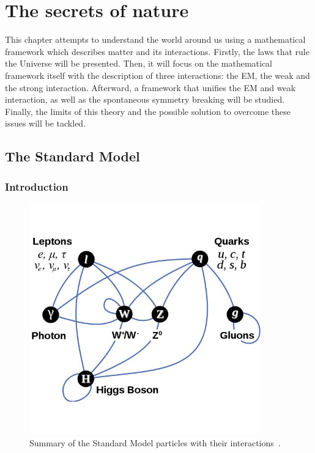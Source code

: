 \chapter{The secrets of nature}
\label{chap:SM}

  This chapter attempts to understand the world around us using a mathematical framework which describes matter and its interactions.
  Firstly, the laws that rule the Universe will be presented.
  Then, it will focus on the mathematical framework itself with the description of three interactions: the \gls{EM}, the weak and the strong interaction.
  Afterward, a framework that unifies the \gls{EM} and weak interaction, as well as the spontaneous symmetry breaking will be studied.
  Finally, the limits of this theory and the possible solution to overcome these issues will be tackled.
 
  \minitoc
  
  \section{The Standard Model}

    \subsection{Introduction}
     
    \begin{figure}[!h]
    \centering
      \includegraphics[width = 10cm]{Pictures/SM/elementaryParticles.jpg}
    \caption{Summary of the Standard Model particles with their interactions~\cite{SM}.}
    \label{fig:partInterac}
    \end{figure}   
    
